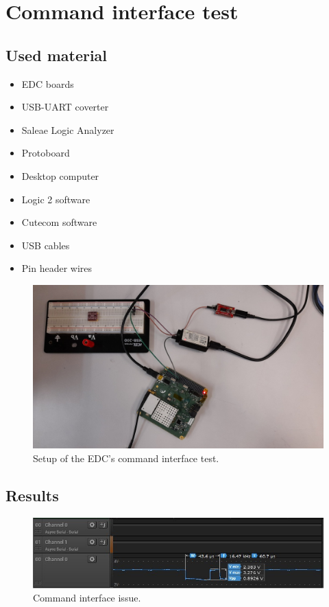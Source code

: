 \section{Command interface test}

\subsection{Used material}

\begin{itemize}
    \item EDC boards
    \item USB-UART coverter
    \item Saleae Logic Analyzer
    \item Protoboard
    \item Desktop computer
    \item Logic 2 software
    \item Cutecom software
    \item USB cables
    \item Pin header wires
\end{itemize}

\begin{figure}[!ht]
    \begin{center}
        \includegraphics[width=\textwidth]{figures/edc_report/cmd-test-setup}
        \caption{Setup of the EDC's command interface test.}
        \label{fig:edc-test-setup}
    \end{center}
\end{figure}

\subsection{Results}

\begin{figure}[!ht]
    \begin{center}
        \includegraphics[width=\textwidth]{figures/edc_report/edc-cmd-issue}
        \caption{Command interface issue.}
        \label{fig:edc-cmd-issue}
    \end{center}
\end{figure}

